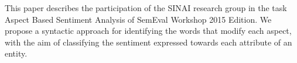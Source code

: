 This paper describes the participation of the SINAI research group in the task Aspect Based Sentiment Analysis of SemEval Workshop 2015 Edition. We propose a syntactic approach for identifying the words that modify each aspect, with the aim of classifying the sentiment expressed towards each attribute of an entity.
